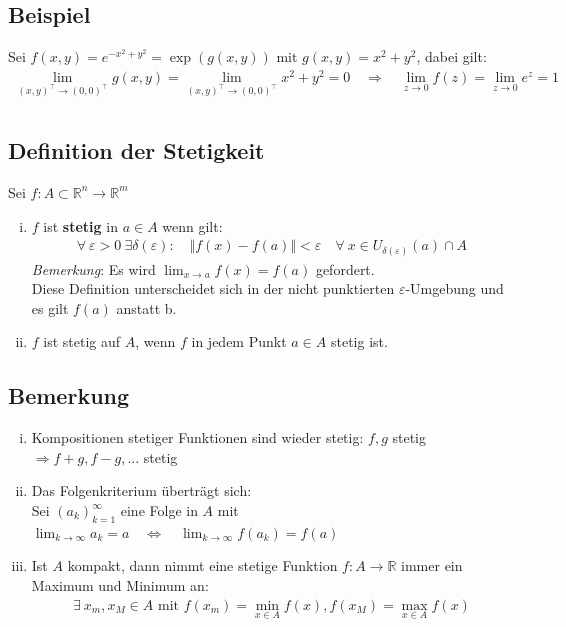 \documentclass[11pt,a4paper]{book}
\newcommand {\R}	{\mathbb{R}}
\newcommand {\Rn}	{\mathbb{R}^n}
\newcommand {\Rm}	{\mathbb{R}^m}
\newcommand{\1}    	{\mathbbm{1}}
\newcommand{\mitt}	{\textrm{ mit }}
\begin{document}
\subsection{Beispiel}
Sei \(f(x,y) = e^{-x^2 + y^2} = \exp\left( g(x,y) \right) \mitt g(x,y) = x^2 + y^2\), dabei gilt:
\begin{align*}
	\lim_{(x,y)^\top \rightarrow (0,0)^\top} g(x,y) = \lim_{(x,y)^\top \rightarrow (0,0)^\top} x^2 + y^2 = 0
	\quad \Rightarrow \quad \lim_{z \rightarrow 0} f(z) = \lim_{z \rightarrow 0} e^z = 1 \\
\end{align*}

\subsection{Definition der Stetigkeit}
Sei \(f: A \subset \Rn \rightarrow \Rm\)
\begin{enumerate}[(i)]
	\item \(f\) ist \textbf{stetig} in \(a \in A\) wenn gilt:
	\begin{align*}
		\forall~ \varepsilon > 0 ~ \exists \delta(\varepsilon) : \quad \Vert f(x) - f(a) \Vert < \varepsilon \quad \forall~ x \in U_{\delta(\varepsilon)}(a) \cap A
	\end{align*}
	\textit{Bemerkung}: Es wird \( \lim_{x \rightarrow a} f(x) = f(a) \) gefordert. \\
	Diese Definition unterscheidet sich in der nicht punktierten \(\varepsilon\)-Umgebung und es gilt \(f(a)\) anstatt b.
	\item \(f\) ist stetig auf \(A\), wenn \(f\) in jedem Punkt \(a \in A\) stetig ist.
\end{enumerate}

\subsection{Bemerkung}
\begin{enumerate}[(i)]
	\item Kompositionen stetiger Funktionen sind wieder stetig: \(f, g\) stetig \(\Rightarrow f+g, f-g, ...\) stetig
	\item Das Folgenkriterium überträgt sich: \\
	Sei \((a_k)_{k=1}^\infty \) eine Folge in \(A\) mit \(\lim_{k \rightarrow \infty} a_k = a  \quad \Leftrightarrow \quad \lim_{k \rightarrow \infty} f(a_k) = f(a)\)
	\item Ist \(A\) kompakt, dann nimmt eine stetige Funktion \(f : A \rightarrow \R\) immer ein Maximum und Minimum an:
	\begin{align*}
		\exists~ x_m, x_M \in A \mitt f(x_m) = \min_{x \in A} f(x), f(x_M) = \max_{x \in A} f(x)
	\end{align*}
\end{enumerate}
\end{document}
